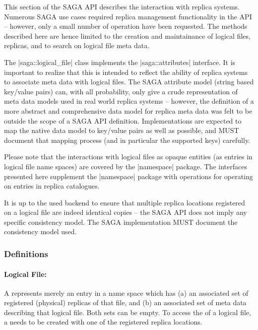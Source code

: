  
   This section of the SAGA API describes the interaction with
   replica systems.  Numerous SAGA use cases required replica
   management functionality in the API -- however, only a small
   number of operation have been requested.  The methods
   described here are hence limited to the creation and
   maintainance of logical files, replicas, and to search on
   logical file meta data.
 
   The |saga::logical_file| class implements the
   |saga::attributes| interface.  It is important to realize that
   this is intended to reflect the ability of replica
   systems to associate meta data with logical files.  The SAGA
   attribute model (string based key/value pairs) can, with all
   probability, only give a crude representation of
   meta data models used in real world replica systems --
   however, the definition of a more abstract and comprehensive
   data model for replica meta data was felt to be outside the
   scope of a SAGA API definition.  Implementations are expected
   to map the native data model to key/value pairs as well as
   possible, and MUST document that mapping process (and in
   particular the supported keys) carefully.
 
   Please note that the interactions with logical files as
   opaque entities (as entries in logical file name spaces) are
   covered by the |namespace| package.  The interfaces presented
   here supplement the |namespace| package with operations for
   operating on entries in replica catalogues.
 
   It is up to the used backend to ensure that multiple
   replica locations registered on a logical file are indeed
   identical copies -- the SAGA API does not imply any specific
   consistency model.  The SAGA implementation MUST document the
   consistency model used.
 
   \subsubsection{Definitions}
 
    \paragraph{Logical File:} A  represents
    merely an entry in a name space which has (a) an associated
    set of registered (physical) replicas of that file, and (b)
    an associated set of meta data describing that logical file.
    Both sets can be empty.  To access the 
    of a logical file, a  needs to be created with
    one of the registered replica locations.
 
